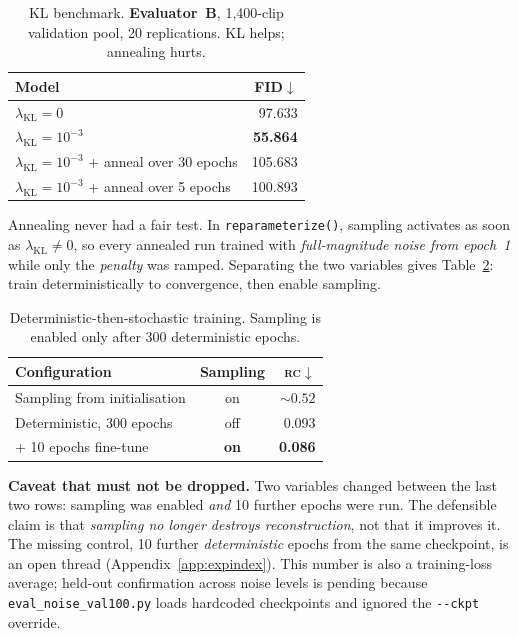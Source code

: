\documentclass[11pt,a4paper]{report}
\newcommand{\rc}{\textsc{rc}}
\newcommand{\best}[1]{\textbf{#1}}
\newcommand{\lkl}{\ensuremath{\lambda_{\mathrm{KL}}}}
\newcommand{\callout}[1]{\begin{calloutenv}\small #1\end{calloutenv}}
\begin{document}
\begin{table}[H]
\centering
\caption{KL benchmark. \textbf{Evaluator~B}, 1{,}400-clip validation pool,
20 replications. KL helps; annealing hurts.}
\label{tab:kl-bench}
\small
\begin{tabular}{@{}lr@{}}
\toprule
Model & FID$\downarrow$ \\
\midrule
$\lkl=0$ & 97.633 \\
$\lkl=10^{-3}$ & \best{55.864} \\
$\lkl=10^{-3}$ + anneal over 30 epochs & 105.683 \\
$\lkl=10^{-3}$ + anneal over 5 epochs & 100.893 \\
\bottomrule
\end{tabular}
\end{table}

Annealing never had a fair test. In \texttt{reparameterize()}, sampling
activates as soon as $\lkl\neq0$, so every annealed run trained with
\emph{full-magnitude noise from epoch~1} while only the \emph{penalty} was
ramped. Separating the two variables gives Table~\ref{tab:det-then-stoch}:
train deterministically to convergence, then enable sampling.

\begin{table}[H]
\centering
\caption{Deterministic-then-stochastic training. Sampling is enabled only
after 300 deterministic epochs.}
\label{tab:det-then-stoch}
\small
\begin{tabular}{@{}lcr@{}}
\toprule
Configuration & Sampling & \rc$\downarrow$ \\
\midrule
Sampling from initialisation & on & ${\sim}0.52$ \\
Deterministic, 300 epochs & off & 0.093 \\
\quad + 10 epochs fine-tune & \best{on} & \best{0.086} \\
\bottomrule
\end{tabular}
\end{table}

\callout{\textbf{Caveat that must not be dropped.} Two variables changed
between the last two rows: sampling was enabled \emph{and} 10 further
epochs were run. The defensible claim is that \emph{sampling no longer
destroys reconstruction}, not that it improves it. The missing control, 10 further \emph{deterministic} epochs from the same checkpoint, is an
open thread (Appendix~\ref{app:expindex}). This number is also a
training-loss average; held-out confirmation across noise levels is pending
because \texttt{eval\_noise\_val100.py} loads hardcoded checkpoints and
ignored the \texttt{-{}-ckpt} override.}
\end{document}
